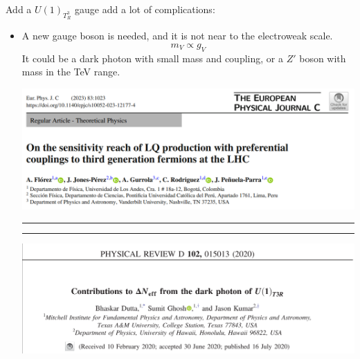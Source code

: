 \documentclass{../bredelebeamer}
\begin{document}
\begin{frame}{Add a $U(1)_{T^3_R}$ gauge add a lot of complications: }
	\begin{itemize}
		\item  A new gauge boson is needed, and it is not near to the electroweak scale.
		$$
			m_V \propto g_V
		$$
		It could be a dark photon with small mass and coupling, or a $Z'$ boson with mass in the TeV range.
		\vfill 
		\begin{center}
			\includegraphics[width=.8\textwidth]{florez2023.png}
		\end{center}
		\hrule\hrule
		\begin{center}
			\includegraphics[width=.7\textwidth]{dutta2020b.png}
		\end{center}
	\end{itemize}
\end{frame}
\end{document}

